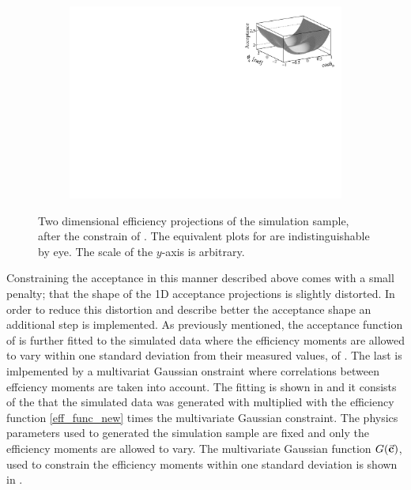 \begin{figure}[t]
\begin{subfigure}{0.5\textwidth}
    \includegraphics[width=\textwidth]{Figures/Chapter4/canv_cosThL_phi_Sim08_3fb_hel_negKaons_all.pdf}
    \caption{}
    \label{eff2D_lp}
  \end{subfigure}
\caption{Two dimensional efficiency projections of the \BsJpsiKst simulation sample, after the constrain of .
         The equivalent plots for \BsbarJpsiKst are indistinguishable by eye. The scale of the $y$-axis is arbitrary.}
    \label{eff2D}
\end{figure}


Constraining the acceptance in this manner described above comes with a small penalty; that the shape of the 1D acceptance
projections is slightly distorted. In order to reduce this distortion and describe better the acceptance shape an additional step is implemented.
As previously mentioned, the acceptance function of  is further fitted to the simulated data
where the efficiency moments are allowed to vary within one standard deviation from their measured values, of .
The last is imlpemented by a multivariat Gaussian onstraint where correlations between effciency moments are taken into account.
The fitting \pdf is shown in  and it consists of the \pdf that the simulated
data was generated with multiplied with the efficiency function \eqref{eff_func_new} times the multivariate Gaussian constraint.
The physics parameters used to generated the simulation sample are fixed and only the efficiency moments are allowed to vary.
The multivariate Gaussian function $G(\vec{\bf{c}})$, used to constrain the efficiency moments within one standard deviation is shown in .

